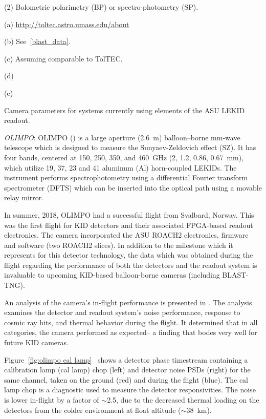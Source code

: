 \begin{table}
\begin{threeparttable}
\begin{tablenotes}
\item (2) Bolometric polarimetry (BP) or spectro-photometry (SP).
\item (a) \url{http://toltec.astro.umass.edu/about}
\item (b) See~\ref{blast_data}.
\item (c) Assuming comparable to TolTEC.
\item (d) \citet{paiella2019kinetic}
\item (e) \citet{mcgeehan2018low}
\end{tablenotes}
\caption{Camera parameters for systems currently using elements of the ASU LEKID readout.}
\label{tab:cameras}
\end{threeparttable}
\end{table}

\vspace{5mm}

\textit{OLIMPO}: OLIMPO (\citet{masi2008olimpo,paiella2019kinetic}) is a large aperture (2.6~m) balloon–borne mm-wave telescope which is designed to measure the Sunyaev-Zeldovich effect (SZ). It has four bands, centered at 150, 250, 350, and 460~GHz (2, 1.2, 0.86, 0.67~mm), which utilize 19, 37, 23 and 41 aluminum (Al) horn-coupled LEKIDs. The instrument performs spectrophotometry using a differential Fourier transform spectrometer (DFTS) which can be inserted into the optical path using a movable relay mirror.

In summer, 2018, OLIMPO had a successful flight from Svalbard, Norway. This was the first flight for KID detectors and their associated FPGA-based readout electronics. The camera incorporated the ASU ROACH2 electronics, firmware and software (two ROACH2 slices). In addition to the milestone which it represents for this detector technology, the data which was obtained during the flight regarding the performance of both the detectors and the readout system is invaluable to upcoming KID-based balloon-borne cameras (including BLAST-TNG).

An analysis of the camera's in-flight performance is presented in \citet{masi2019kinetic}. The analysis examines the detector and readout system's noise performance, response to cosmic ray hits, and thermal behavior during the flight. It determined that in all categories, the camera performed as expected-- a finding that bodes very well for future KID cameras.

Figure~\ref{fig:olimpo cal lamp}~\citep{masi2019kinetic} shows a detector phase timestream containing a calibration lamp (cal lamp) chop (left) and detector noise PSDs (right) for the same channel, taken on the ground (red) and during the flight (blue). The cal lamp chop is a diagnostic used to measure the detector responsivities. The noise is lower in-flight by a factor of $\sim$2.5, due to the decreased thermal loading on the detectors from the colder environment at float altitude ($\sim$38~km).

